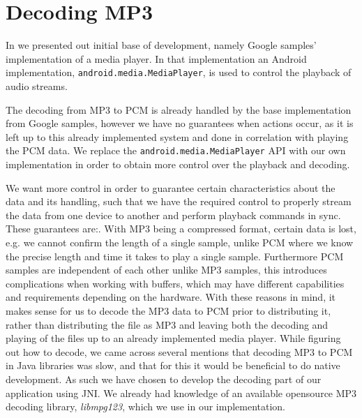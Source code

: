 \section{Decoding MP3}
In  we presented out initial base of development, namely Google samples' implementation of a media player.
In that implementation an Android implementation, \texttt{android.media.MediaPlayer}, is used to control the playback of audio streams.

The decoding from MP3 to \ac{PCM} is already handled by the base implementation from Google samples, however we have no guarantees when actions occur, as it is left up to this already implemented system and done in correlation with playing the \ac{PCM} data.
We replace the \texttt{android.media.MediaPlayer} API with our own implementation in order to obtain more control over the playback and decoding.

We want more control in order to guarantee certain characteristics about the data and its handling, such that we have the required control to properly stream the data from one device to another and perform playback commands in sync.
These guarantees are:.
With MP3 being a compressed format, certain data is lost, e.g. we cannot confirm the length of a single sample, unlike \ac{PCM} where we know the precise length and time it takes to play a single sample.
Furthermore \ac{PCM} samples are independent of each other unlike MP3 samples, this introduces complications when working with buffers, which may have different capabilities and requirements depending on the hardware.
With these reasons in mind, it makes sense for us to decode the MP3 data to \ac{PCM} prior to distributing it, rather than distributing the file as MP3 and leaving both the decoding and playing of the files up to an already implemented media player.
\bigskip
While figuring out how to decode, we came across several mentions that decoding MP3 to \ac{PCM} in Java libraries was slow, and that for this it would be beneficial to do native development\cite{slow_java_stackoverflow}\cite{slow_java_lib}.
As such we have chosen to develop the decoding part of our application using \ac{JNI}.
We already had knowledge of an available opensource MP3 decoding library, \textit{libmpg123}, which we use in our implementation.
%

